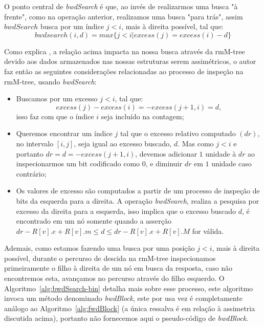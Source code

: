     O ponto central de \textit{bwdSearch} é que, ao invés de realizarmos uma busca "à frente", como na operação anterior, realizamos uma busca "para trás", assim $bwdSearch$ busca por um índice $j < i$, mais à direita possível, tal que:
    $$bwdsearch(i,d) = max\{j < i | excess(j) = excess(i) - d\}$$

    Como explica \citet{book-compact-data-structures}, a relação acima impacta na nossa busca através da rmM-tree devido aos dados armazenados nas nossas estruturas serem assimétricos, o autor faz então as seguintes considerações relacionadas ao processo de inspeção na rmM-tree,  usando \textit{bwdSearch}:
    \begin{itemize}
        \item Buscamos por um excesso $j<i$, tal que:
         $$excess(j) - excess(i) = - excess(j+1,i) = d,$$ 
         isso faz com que o índice $i$ seja incluído na contagem;
        \item Queremos encontrar um índice $j$ tal que o excesso relativo computado $(dr)$, no intervalo $[i,j]$, seja igual ao excesso buscado, $d$. Mas como $j < i $ e portanto $dr = d = -excess(j+1,i)$, devemos adicionar $1$ unidade à $dr$ ao inspecionarmos um bit codificado como $0$, e diminuir $dr$ em $1$ unidade caso contrário;
        \item  Os valores de excesso são computados a partir de um processo de inspeção de bits da esquerda para a direita. A operação \textit{bwdSearch}, realiza a pesquisa por excesso da direita para a esquerda, isso implica que o excesso buscado $d$, é encontrado em um nó somente quando a asserção $dr - R[v].e + R[v].m \leq d \leq dr - R[v].e + R[v].M$ for válida.
    \end{itemize}

    Ademais, como estamos fazendo uma busca por uma posição $j<i$, mais à direita possível, durante o percurso de descida na rmM-tree inspecionamos primeiramente o filho à direita de um nó em busca da resposta, caso não encontremos esta, avançamos no percurso através do filho esquerdo. O Algoritmo~\ref*{alg:bwdSearch-bin} detalha mais sobre esse processo, este algoritmo invoca um método denominado \textit{bwdBlock}, este por usa vez é completamente análogo  ao Algoritmo~\ref{alg:fwdBlock} (a única ressalva é em relação à assimetria discutida acima), portanto não fornecemos aqui o pseudo-código de \textit{bwdBlock}.

